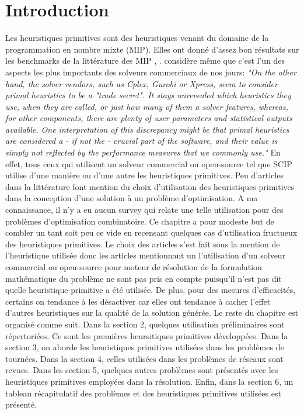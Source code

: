 \documentclass[12pt,a4paper,oneside]{book}
\theoremstyle{definition}
\begin{document}
	\section{Introduction}
	Les heuristiques primitives sont des heuristiques venant du domaine de la programmation en nombre mixte (MIP). Elles ont donné d'assez bon résultats sur les benchmarks de la littérature des MIP \cite{berthold2006}, \cite{Achterberg2012}. \cite{Berthold2013} considère même que c'est l'un des aspects les plus importants des solveurs commerciaux de nos jours: \textit{"On the other hand, the solver vendors, such as Cplex, Gurobi or Xpress, seem to consider primal heuristics to be a "trade secret". It stays unrevealed which heuristics they use, when they are called, or just how many of them a solver features, whereas, for other components, there are plenty of user parameters and statistical outputs available. One interpretation of this discrepancy might be that primal heuristics are considered a - if not the - crucial part of the software, and their value is simply not reflected by the performance measures that we commonly use."} En effet, tous ceux qui utilisent un solveur commercial ou open-source tel que SCIP utilise d'une manière ou d'une autre les heuristiques primitives. Peu d'articles dans la littérature font mention du choix d'utilisation des heuristiques primitives dans la conception d'une solution à un problème d'optimisation. A ma connaissance, il n'y a eu aucun survey qui relate une telle utilisation pour des problèmes d'optimisation combinatoire. Ce chapitre a pour modeste but de combler un tant soit peu ce vide en recensant quelques cas d'utilisation fructueux des heuristiques primitives. Le choix des articles s'est fait sous la mention de l'heuristique utilisée donc les articles mentionnant un l'utilisation d'un solveur commercial ou open-source pour moteur de résolution de la formulation mathématique du problème ne sont pas pris en compte puisqu'il n'est pas dit quelle heuristique primitive a été utilisée. De plus, pour des mesures d'efficacités, certains on tendance à les désactiver car elles ont tendance à cacher l'effet d'autres heuristiques sur la qualité de la solution générée. Le reste du chapitre est organisé comme suit. Dans la section 2, quelques utilisation préliminaires sont répertoriées. Ce sont les premières heursitiques primitives développées. Dans la section 3, on aborde les heuristiques primitives utilisées dans les problèmes de tournées. Dans la section 4, celles utilisées dans les problèmes de réseaux sont revues.  Dans les section 5, quelques autres problèmes sont présentés avec les heuristiques primitives employées dans la résolution. Enfin, dans la section 6, un tableau récapitulatif des problèmes et des heuristiques primitives utilisées est présenté.  
	
\end{document}
